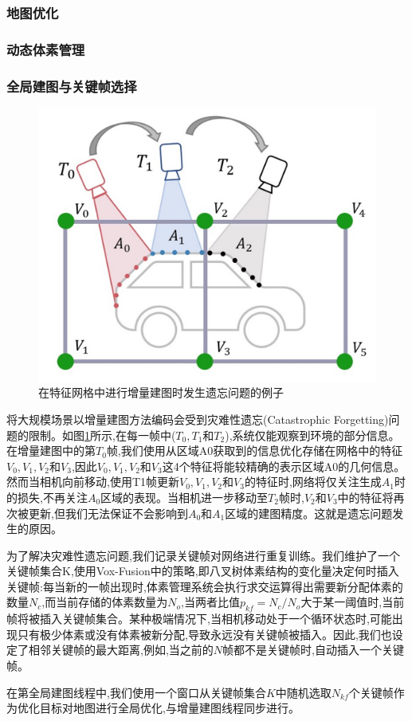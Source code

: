 \subsubsection{地图优化}
\cite{adam}
\subsubsection{动态体素管理}
\subsubsection{全局建图与关键帧选择}
\begin{figure}[htbp]
    \includegraphics[scale = 0.2]{figures/forgetting.jpg}
    \centering
    \caption{在特征网格中进行增量建图时发生遗忘问题的例子} \label{forgetting}
\end{figure}
将大规模场景以增量建图方法编码会受到灾难性遗忘(Catastrophic Forgetting)问题的限制。如图\ref{forgetting}所示,在每一帧中($T_0, T_1$和$T_2$),系统仅能观察到环境的部分信息。在增量建图中的第$T_0$帧,我们使用从区域A0获取到的信息优化存储在网格中的特征$V_0, V_1, V_2$和$V_3$,因此$V_0, V_1, V_2$和$V_3$这4个特征将能较精确的表示区域A0的几何信息。然而当相机向前移动,使用T1帧更新$V_0, V_1, V_2$和$V_3$的特征时,网络将仅关注生成$A_1$时的损失,不再关注$A_0$区域的表现。当相机进一步移动至$T_2$帧时,$V_2$和$V_3$中的特征将再次被更新,但我们无法保证不会影响到$A_0$和$A_1$区域的建图精度。这就是遗忘问题发生的原因。

为了解决灾难性遗忘问题,我们记录关键帧对网络进行重复训练。我们维护了一个关键帧集合K,使用Vox-Fusion中的策略,即八叉树体素结构的变化量决定何时插入关键帧:每当新的一帧出现时,体素管理系统会执行求交运算得出需要新分配体素的数量$N_c$,而当前存储的体素数量为$N_o$,当两者比值$p_{kf}=N_c/N_o$大于某一阈值时,当前帧将被插入关键帧集合。某种极端情况下,当相机移动处于一个循环状态时,可能出现只有极少体素或没有体素被新分配,导致永远没有关键帧被插入。因此,我们也设定了相邻关键帧的最大距离,例如,当之前的$N$帧都不是关键帧时,自动插入一个关键帧。

在第全局建图线程中,我们使用一个窗口从关键帧集合$K$中随机选取$N_{kf}$个关键帧作为优化目标对地图进行全局优化,与增量建图线程同步进行。
